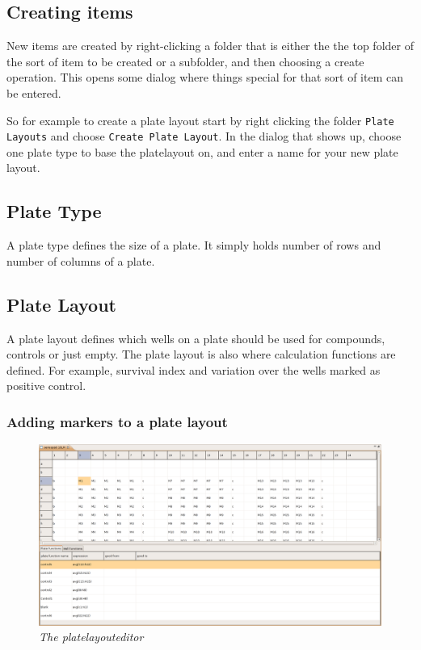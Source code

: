 \documentclass[a4paper,10pt]{article}
\begin{document}
        \subsection{Creating items}
            New items are created by right-clicking a folder that is either the
            the top folder of the sort of item to be created or a subfolder,
            and then choosing a create operation. This opens some dialog where
            things special for that sort of item can be entered. 

            So for example to create a plate layout start by right clicking the
            folder \texttt{Plate Layouts} and choose \texttt{Create Plate
            Layout}. In the dialog that shows up, choose one plate type to base
            the platelayout on, and enter a name for your new plate layout.

        \subsection{Plate Type} A plate type defines the size of a plate. It
            simply holds number of rows and number of columns of a plate. 

        \subsection{Plate Layout}
            A plate layout defines which wells on a plate should be used for
            compounds, controls or just empty. The plate layout is also where
            calculation functions are defined. For example, survival index and
            variation over the wells marked as positive control. 

            \subsubsection{Adding markers to a plate layout}
                \begin{figure}[htbp]
                    \begin{center}
                        \includegraphics[width=1\textwidth]
                                        {images/plateLayoutEditor.png}
                    \end{center}
                    \caption{\textit{The platelayouteditor}}
                    \label{platelayoutEditor}
                \end{figure}
\end{document}
